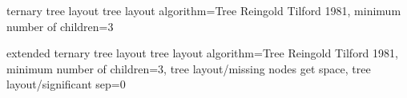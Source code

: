 %
%
\pgfgddeclarealgorithmkey
  {ternary tree layout}
  {tree layout}
  {
    algorithm=Tree Reingold Tilford 1981,
    minimum number of children=3
  }

%
%
\pgfgddeclarealgorithmkey
  {extended ternary tree layout}
  {tree layout}
  {
    algorithm=Tree Reingold Tilford 1981,
    minimum number of children=3,
    tree layout/missing nodes get space,
    tree layout/significant sep=0
  }





\endinput

